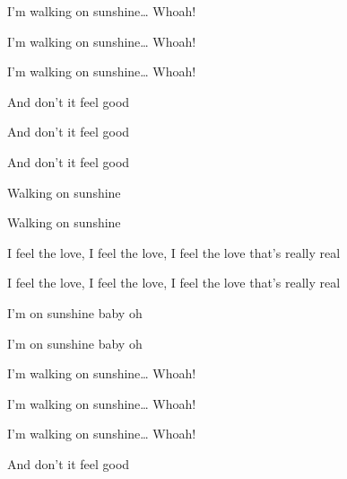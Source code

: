 \begin{song}
\bigskip

I'm walking on sunshine… Whoah! \par
I'm walking on sunshine… Whoah! \par
I'm walking on sunshine… Whoah! \par
And don't it feel good    \par
And don't it feel good    \par
And don't it feel good    \par

\bigskip

    \par

\bigskip

Walking on sunshine    \par
Walking on sunshine    \par

\bigskip

I feel the love, I feel the love, I feel the love that's really real \par
I feel the love, I feel the love, I feel the love that's really real \par

\bigskip

I'm on sunshine baby oh  \par
I'm on sunshine baby oh  \par

\bigskip

I'm walking on sunshine… Whoah! \par
I'm walking on sunshine… Whoah! \par
I'm walking on sunshine… Whoah! \par
And don't it feel good \par

\end{song}
